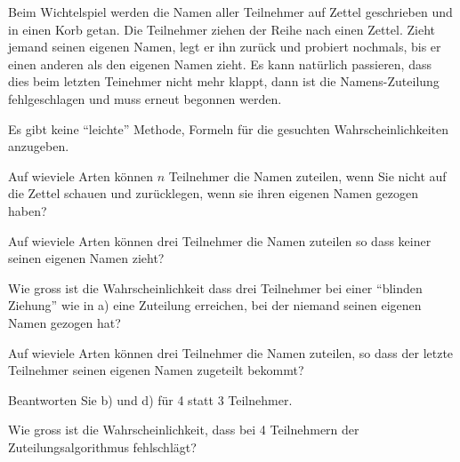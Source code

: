 Beim Wichtelspiel werden die Namen aller Teilnehmer auf Zettel geschrieben
und in einen Korb getan.
Die Teilnehmer ziehen der Reihe nach einen Zettel.
Zieht jemand seinen eigenen Namen, legt er ihn zurück und probiert
nochmals, bis er einen anderen als den eigenen Namen zieht.
Es kann natürlich passieren, dass dies beim letzten Teinehmer
nicht mehr klappt, dann ist die Namens-Zuteilung fehlgeschlagen und
muss erneut begonnen werden.

\begin{hinweis}
Es gibt keine ``leichte'' Methode, Formeln für die gesuchten
Wahrscheinlichkeiten anzugeben.
\end{hinweis}


\begin{teilaufgaben}
\item Auf wieviele Arten können $n$ Teilnehmer die Namen zuteilen,
wenn Sie nicht auf die Zettel schauen und zurücklegen, wenn sie ihren
eigenen Namen gezogen haben?
\item Auf wieviele Arten können drei Teilnehmer die Namen zuteilen
so dass keiner seinen eigenen Namen zieht?
\item Wie gross ist die Wahrscheinlichkeit dass drei Teilnehmer
bei einer ``blinden Ziehung'' wie in a) eine Zuteilung erreichen, bei
der niemand seinen eigenen Namen gezogen hat?
\item Auf wieviele Arten können drei Teilnehmer die Namen zuteilen,
so dass der letzte Teilnehmer seinen eigenen Namen zugeteilt bekommt?
\item Beantworten Sie b) und d) für 4 statt 3 Teilnehmer.
\item Wie gross ist die Wahrscheinlichkeit, dass bei 4 Teilnehmern
der Zuteilungsalgorithmus fehlschlägt?
\end{teilaufgaben}

